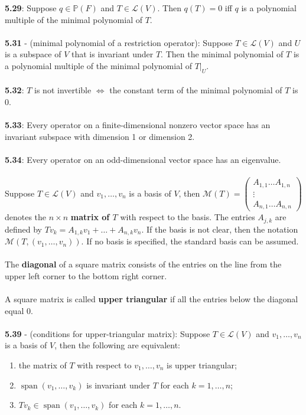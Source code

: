 \documentclass{article}
\DeclareMathOperator{\Span}{span}
\theoremstyle{definition}
\begin{document}
\textbf{5.29}: Suppose $q \in \mathbb{P}(F)$ and $T \in \mathcal{L}(V)$. Then $q(T) = 0$ iff $q$ is a polynomial multiple of the minimal polynomial of $T$. \\ \\
\textbf{5.31} - (minimal polynomial of a restriction operator): Suppose $T \in \mathcal{L}(V)$ and $U$ is a subspace of $V$ that is invariant under $T$. Then the  minimal polynomial of $T$ is a polynomial multiple of the minimal polynomial
of $T|_U$. \\ \\
\textbf{5.32}: $T$ is not invertible $\iff$ the constant term of the minimal polynomial of $T$ is 0. \\ \\
\textbf{5.33}: Every operator on a finite-dimensional nonzero vector space has an invariant subspace with dimension 1 or dimension 2. \\ \\
\textbf{5.34}: Every operator on an odd-dimensional vector space has an eigenvalue. \\ \\
Suppose $T \in \mathcal{L}(V)$ and $v_1, \dots, v_n$ is a basis of $V$, then $\mathcal{M}(T) = \begin{pmatrix}
A_{1, 1} \dots A_{1, n} \\
\vdots  \\
A_{n, 1} \dots A_{n, n}
\end{pmatrix}$ denotes the $n \times n$ \textbf{matrix of $T$} with respect to the basis. The entries $A_{j, k}$ are defined by $Tv_k = A_{1, k}v_1 + \dots + A_{n, k}v_n$. If the basis is not clear, then the notation $\mathcal{M}(T, (v_1, \dots, v_n))$. If no basis is specified, the standard basis can be assumed. \\ \\
The \textbf{diagonal} of a square matrix consists of the entries on the line from the upper left corner to the bottom right corner. \\ \\
A square matrix is called \textbf{upper triangular} if all the entries below the diagonal equal 0. \\ \\
\textbf{5.39} - (conditions for upper-triangular matrix): Suppose $T \in \mathcal{L}(V)$ and $v_1, \dots, v_n$ is a basis of $V$, then the following are equivalent: \begin{enumerate}
    \item the matrix of $T$ with respect to $v_1, \dots, v_n$ is upper triangular;
    \item $\Span(v_1, \dots, v_k)$ is invariant under $T$ for each $k = 1, \dots, n$;
    \item $Tv_k \in \Span(v_1, \dots, v_k)$ for each $k = 1, \dots, n$.
\end{enumerate} $ $ \\
\end{document}

